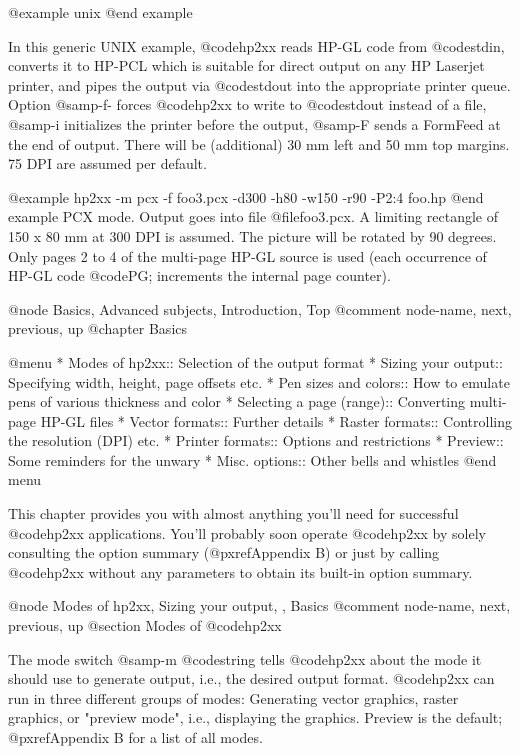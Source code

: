 @example
unix%
@end example

In this generic UNIX example, @code{hp2xx} reads HP-GL code from @code{stdin},
converts it to HP-PCL which is suitable for direct output on any HP Laserjet
printer, and pipes the output via @code{stdout} into the appropriate printer queue.
Option @samp{-f-} forces @code{hp2xx} to write to @code{stdout} instead of
a file, @samp{-i} initializes the printer before the output,
@samp{-F} sends a FormFeed at the end of output. There will be (additional)
30 mm left and 50 mm top margins. 75 DPI are assumed per default.

@example
hp2xx -m pcx -f foo3.pcx -d300 -h80 -w150 -r90 -P2:4  foo.hp
@end example
PCX mode. Output goes into file @file{foo3.pcx}. A limiting rectangle
of 150 x 80 mm at 300 DPI is assumed. The picture will be rotated by
90 degrees. Only pages 2 to 4 of the multi-page HP-GL source is used (each
occurrence of HP-GL code @code{PG;} increments the internal page counter).



@node Basics, Advanced subjects, Introduction, Top
@comment  node-name,  next,  previous,  up
@chapter Basics

@menu
* Modes of hp2xx::           Selection of the output format
* Sizing your output::       Specifying width, height, page offsets etc.
* Pen sizes and colors::     How to emulate pens of various thickness and color
* Selecting a page (range):: Converting multi-page HP-GL files
* Vector formats::           Further details
* Raster formats::           Controlling the resolution (DPI) etc.
* Printer formats::          Options and restrictions
* Preview::                  Some reminders for the unwary
* Misc. options::            Other bells and whistles
@end menu

This chapter provides you with almost anything you'll need for successful
@code{hp2xx} applications. You'll probably soon operate @code{hp2xx}
by solely consulting the option summary (@pxref{Appendix B}) or just
by calling @code{hp2xx} without any parameters to obtain its built-in
option summary.


@node Modes of hp2xx, Sizing your output, , Basics
@comment  node-name,  next,  previous,  up
@section Modes of @code{hp2xx}

The mode switch @samp{-m @code{string}} tells @code{hp2xx} about the mode it
should use to generate output, i.e., the desired output format. @code{hp2xx}
can run in three different groups of modes: Generating vector graphics,
raster graphics, or "preview mode", i.e., displaying the graphics.
Preview is the default; @pxref{Appendix B} for a list of all modes.



